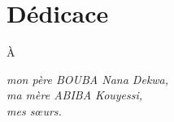 \chapter*{Dédicace}

\renewcommand{\abstractnamefont}{\normalfont\Large\bfseries}


\hskip7mm
\begin{spacing}{1.3}
	\hspace{13cm}\Large{À}
	\begin{flushright}
	\itshape
mon père BOUBA Nana Dekwa,\\
ma mère ABIBA Kouyessi,\\
mes sœurs.\\
	\end{flushright}
\end{spacing}
